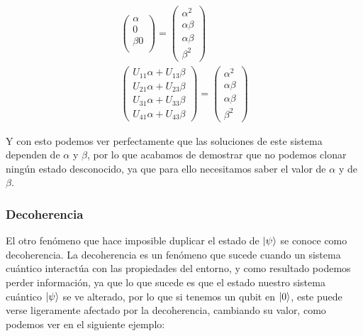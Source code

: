 \documentclass[12pt]{article}
\numberwithin{equation}{section} %
\begin{document}
\begin{gather*}
\begin{pmatrix}
            \alpha \\
            0 \\
            \beta
            0 \\
        \end{pmatrix} = \begin{pmatrix}
            \alpha^{2} \\
            \alpha \beta \\
            \alpha \beta \\
            \beta^{2}
        \end{pmatrix} \\[5pt]
        \begin{pmatrix}
            U_{11} \alpha + U_{13} \beta \\
            U_{21} \alpha + U_{23} \beta \\
            U_{31} \alpha + U_{33} \beta \\
            U_{41} \alpha + U_{43} \beta 
        \end{pmatrix} = \begin{pmatrix}
            \alpha^{2} \\
            \alpha \beta \\
            \alpha \beta \\
            \beta^{2}
        \end{pmatrix}
    \end{gather*}

    \vspace{2.5mm}

    Y con esto podemos ver perfectamente que las soluciones de este sistema dependen de \( \alpha \) y \( \beta \), por lo que acabamos de demostrar que no podemos clonar ningún estado desconocido, ya que para ello necesitamos saber el valor de \( \alpha \) y de \( \beta \).

    \vspace{5mm}

    \subsubsection{Decoherencia}

    \vspace{5mm}

    El otro fenómeno que hace imposible duplicar el estado de \( \ket{\psi} \) se conoce como decoherencia. La decoherencia es un fenómeno que sucede cuando un sistema cuántico interactúa con las propiedades del entorno, y como resultado podemos perder información, ya que lo que sucede es que el estado nuestro sistema cuántico \( \ket{\psi} \) se ve alterado, por lo que si tenemos un qubit en \( \ket{0} \), este puede verse ligeramente afectado por la decoherencia, cambiando su valor, como podemos ver en el siguiente ejemplo:
\end{document}
